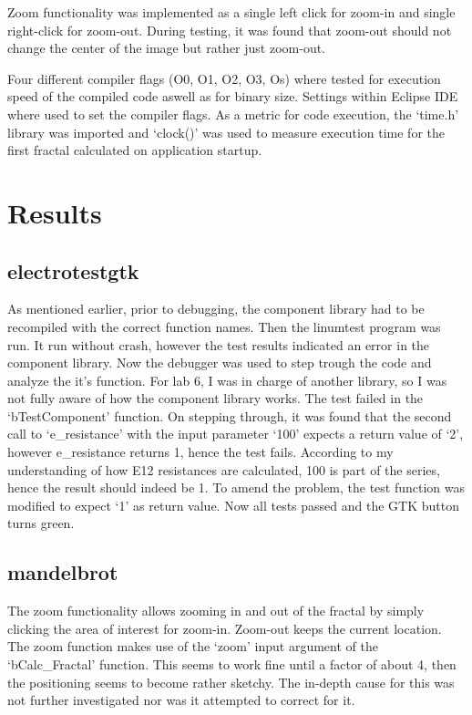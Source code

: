 \documentclass[a4paper,11pt,twoside]{article}
\begin{document}
Zoom functionality was implemented as a single left click for zoom-in
and single right-click for zoom-out. During testing, it was found that zoom-out
should not change the center of the image but rather just zoom-out.

Four different compiler flags (O0, O1, O2, O3, Os) where tested for execution
speed of the compiled code aswell as for binary size. Settings within
Eclipse IDE where used to set the compiler flags. As a metric for code
execution, the `time.h' library was imported and `clock()' was used to measure
execution time for the first fractal calculated on application startup.

\section{Results}
\subsection{electrotestgtk}
As mentioned earlier, prior to debugging, the component library had to be
recompiled with the correct function names. Then the linumtest program was
run. It run without crash, however the test results indicated an error
in the component library. Now the debugger was used to step trough the code
and analyze the it's function. For lab 6, I was in charge of another library,
so I was not fully aware of how the component library works. The test failed
in the `bTestComponent' function. On stepping through, it was found that the
second call to `e\_resistance' with the input parameter `100' expects a return
value of `2', however e\_resistance returns 1, hence the test fails. According
to my understanding of how E12 resistances are calculated, 100 is part of the
series, hence the result should indeed be 1. To amend the problem, the test
function was modified to expect `1' as return value. Now all tests passed
and the GTK button turns green.

\subsection{mandelbrot}
The zoom functionality allows zooming in and out of the fractal by simply
clicking the area of interest for zoom-in. Zoom-out keeps the current location.
The zoom function makes use of the `zoom' input argument of the `bCalc\_Fractal'
function. This seems to work fine until a factor of about 4, then the positioning
seems to become rather sketchy. The in-depth cause for this was not further
investigated nor was it attempted to correct for it.
\end{document}
